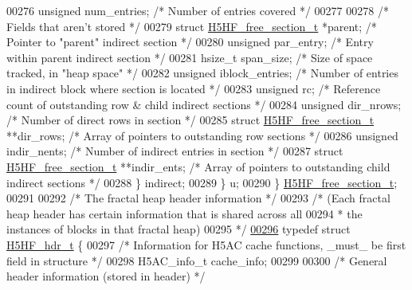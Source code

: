 \begin{DoxyCode}
00276             \textcolor{keywordtype}{unsigned}    num\_entries;            \textcolor{comment}{/* Number of entries covered */}
00277 
00278             \textcolor{comment}{/* Fields that aren't stored */}
00279             \textcolor{keyword}{struct }\hyperlink{struct_h5_h_f__free__section__t}{H5HF\_free\_section\_t} *parent; \textcolor{comment}{/* Pointer to "parent" indirect section 
      */}
00280             \textcolor{keywordtype}{unsigned}    par\_entry;              \textcolor{comment}{/* Entry within parent indirect section */}
00281             hsize\_t     span\_size;              \textcolor{comment}{/* Size of space tracked, in "heap space" */}
00282             \textcolor{keywordtype}{unsigned}    iblock\_entries;         \textcolor{comment}{/* Number of entries in indirect block where section is
       located */}
00283             \textcolor{keywordtype}{unsigned}    rc;                     \textcolor{comment}{/* Reference count of outstanding row & child indirect
       sections */}
00284             \textcolor{keywordtype}{unsigned}    dir\_nrows;              \textcolor{comment}{/* Number of direct rows in section */}
00285             \textcolor{keyword}{struct }\hyperlink{struct_h5_h_f__free__section__t}{H5HF\_free\_section\_t} **dir\_rows;  \textcolor{comment}{/* Array of pointers to outstanding
       row sections */}
00286             \textcolor{keywordtype}{unsigned}    indir\_nents;            \textcolor{comment}{/* Number of indirect entries in section */}
00287             \textcolor{keyword}{struct }\hyperlink{struct_h5_h_f__free__section__t}{H5HF\_free\_section\_t} **indir\_ents; \textcolor{comment}{/* Array of pointers to outstanding
       child indirect sections */}
00288         \} indirect;
00289     \} u;
00290 \} \hyperlink{struct_h5_h_f__free__section__t}{H5HF\_free\_section\_t};
00291 
00292 \textcolor{comment}{/* The fractal heap header information */}
00293 \textcolor{comment}{/* (Each fractal heap header has certain information that is shared across all}
00294 \textcolor{comment}{ * the instances of blocks in that fractal heap)}
00295 \textcolor{comment}{ */}
\hyperlink{struct_h5_h_f__hdr__t}{00296} \textcolor{keyword}{typedef} \textcolor{keyword}{struct }\hyperlink{struct_h5_h_f__hdr__t}{H5HF\_hdr\_t} \{
00297     \textcolor{comment}{/* Information for H5AC cache functions, \_must\_ be first field in structure */}
00298     H5AC\_info\_t cache\_info;
00299 
00300     \textcolor{comment}{/* General header information (stored in header) */}

\end{DoxyCode}
